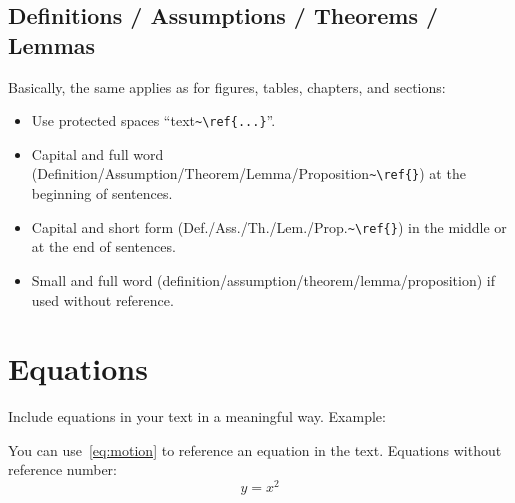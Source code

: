 \subsection{Definitions / Assumptions / Theorems / Lemmas}

Basically, the same applies as for figures, tables, chapters, and sections:
\begin{itemize}
	\item Use protected spaces ``text\verb|~\ref{...}|''.
	\item Capital and full word (Definition/Assumption/Theorem/Lemma/Proposition\verb|~\ref{}|) at the beginning of sentences.
	\item Capital and short form (Def./Ass./Th./Lem./Prop.\verb|~\ref{}|) in the middle or at the end of sentences.
	\item Small and full word (definition/assumption/theorem/lemma/proposition) if used without reference.
\end{itemize}

\section{Equations}
Include equations in your text in a meaningful way. Example: 

\vspace{\baselineskip}

\vspace{\baselineskip}

You can use~\eqref{eq:motion} to reference an equation in the
text. Equations without reference number:
\[
y=x^2
\]



